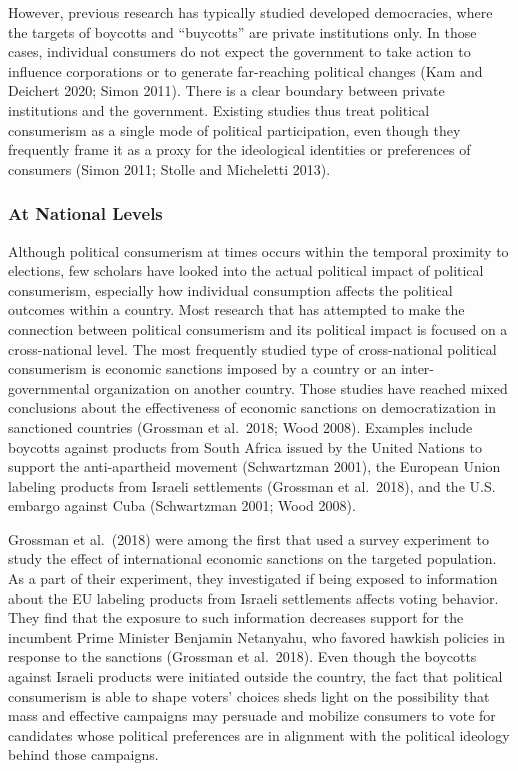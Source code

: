 \documentclass[letterpaper, 12pt]{article}
\begin{document}
However, previous research has typically studied developed democracies, where the targets of boycotts and ``buycotts'' are private institutions only. In those cases, individual consumers do not expect the government to take action to influence corporations or to generate far-reaching political changes (Kam and Deichert 2020; Simon 2011). There is a clear boundary between private institutions and the government. Existing studies thus treat political consumerism as a single mode of political participation, even though they frequently frame it as a proxy for the ideological identities or preferences of consumers (Simon 2011; Stolle and Micheletti 2013). 

\subsubsection{At National Levels}
Although political consumerism at times occurs within the temporal proximity to elections, few scholars have looked into the actual political impact of political consumerism, especially how individual consumption affects the political outcomes within a country. Most research that has attempted to make the connection between political consumerism and its political impact is focused on a cross-national level. The most frequently studied type of cross-national political consumerism is economic sanctions imposed by a country or an inter-governmental organization on another country. Those studies have reached mixed conclusions about the effectiveness of economic sanctions on democratization in sanctioned countries (Grossman et al.\ 2018; Wood 2008). Examples include boycotts against products from South Africa issued by the United Nations to support the anti-apartheid movement (Schwartzman 2001), the European Union labeling products from Israeli settlements (Grossman et al.\ 2018), and the U.S. embargo against Cuba (Schwartzman 2001; Wood 2008). 

Grossman et al.\ (2018) were among the first that used a survey experiment to study the effect of international economic sanctions on the targeted population. As a part of their experiment, they investigated if being exposed to information about the EU labeling products from Israeli settlements affects voting behavior. They find that the exposure to such information decreases support for the incumbent Prime Minister Benjamin Netanyahu, who favored hawkish policies in response to the sanctions (Grossman et al.\ 2018). Even though the boycotts against Israeli products were initiated outside the country, the fact that political consumerism is able to shape voters' choices sheds light on the possibility that mass and effective campaigns may persuade and mobilize consumers to vote for candidates whose political preferences are in alignment with the political ideology behind those campaigns.
\end{document}
